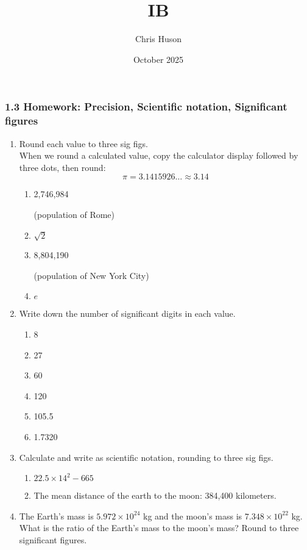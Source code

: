 \documentclass[12pt, twoside]{article}
\title{IB}
\author{Chris Huson}
\date{October 2025}
\begin{document}
\subsubsection*{1.3 Homework: Precision, Scientific notation, Significant figures}

\begin{enumerate}[itemsep=0.5cm]
\item Round each value to three sig figs. \\[0.25cm]
When we round a calculated value, copy the calculator display followed by three dots, then round: $$\pi = 3.1415926\ldots \approx 3.14$$
  \begin{multicols}{2}
    \begin{enumerate}[itemsep=0.5cm]
      \item 2,746,984 \par (population of Rome)
      \item $\sqrt{2}$
      \item 8,804,190 \par (population of New York City)
      \item $e$
    \end{enumerate}
  \end{multicols}

\item Write down the number of significant digits in each value.
  \begin{multicols}{3}
    \begin{enumerate}[itemsep=1cm]
      \item 8
      \item 27
      \item 60
      \item 120
      \item 105.5
      \item 1.7320
    \end{enumerate}
  \end{multicols}

\item Calculate and write as scientific notation, rounding to three sig figs.
  \begin{multicols}{2}
    \begin{enumerate}[itemsep=1cm]
      \item $22.5 \times 14^2-665$
      \item The mean distance of the earth to the moon: 384,400 kilometers.
    \end{enumerate}
  \end{multicols} \vspace{2cm}

  \item The Earth's mass is $5.972 \times 10^{24}$ kg and the moon's mass is $7.348 \times 10^{22}$ kg. What is the ratio of the Earth's mass to the moon's mass? Round to three significant figures.
       
\end{enumerate}
\end{document}
